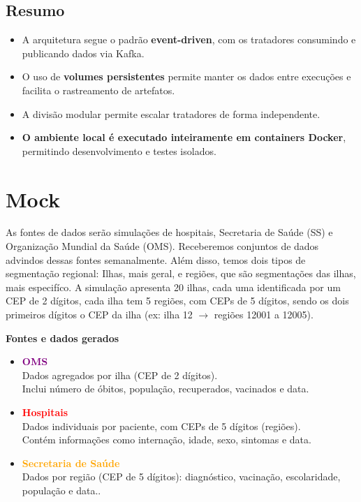 \documentclass[a4paper,12pt]{article}
\begin{document}
\subsection{Resumo}

\begin{itemize}
  \item A arquitetura segue o padrão \textbf{event-driven}, com os tratadores consumindo e publicando dados via Kafka.
  \item O uso de \textbf{volumes persistentes} permite manter os dados entre execuções e facilita o rastreamento de artefatos.
  \item A divisão modular permite escalar tratadores de forma independente.
  \item \textbf{O ambiente local é executado inteiramente em containers Docker}, permitindo desenvolvimento e testes isolados.
\end{itemize}

\section{Mock}

As fontes de dados serão simulações de hospitais,  Secretaria de Saúde (SS) e Organização Mundial da Saúde (OMS). Receberemos conjuntos de dados advindos dessas fontes semanalmente. Além disso, temos dois tipos de segmentação regional: Ilhas, mais geral, e regiões, que são segmentações das ilhas, mais especifíco. A simulação apresenta 20 ilhas, cada uma identificada por um CEP de 2 dígitos, cada ilha tem 5 regiões, com CEPs de 5 dígitos, sendo os dois primeiros dígitos o CEP da ilha (ex: ilha 12 $\rightarrow$ regiões 12001 a 12005).

\vspace{0.5cm}

\textbf{Fontes e dados gerados}

\begin{itemize}
    \item \textcolor{purple}{\textbf{OMS}}\\
    Dados agregados por ilha (CEP de 2 dígitos).\\
    Inclui número de óbitos, população, recuperados, vacinados e data.
    
    \vspace{0.5em}
    
    \item \textcolor{red}{\textbf{Hospitais }}\\
    Dados individuais por paciente, com CEPs de 5 dígitos (regiões).\\
    Contém informações como internação, idade, sexo, sintomas e data.
    
    \vspace{0.5em}
    
    \item \textcolor{orange}{\textbf{Secretaria de Saúde}}\\
    Dados por região (CEP de 5 dígitos): diagnóstico, vacinação, escolaridade, população e data..
\end{itemize}
\end{document}
